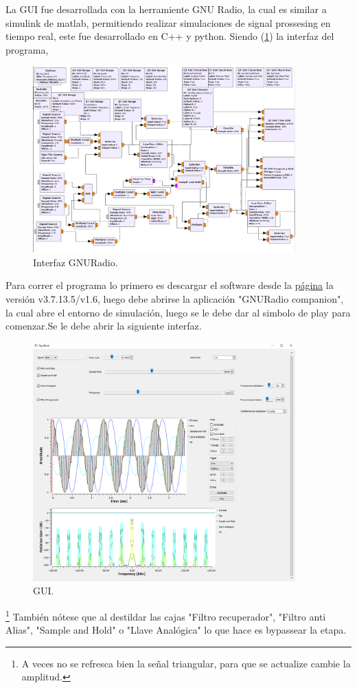 %

%

La GUI fue desarrollada con la herramiente GNU Radio, la cual es similar a simulink de matlab, permitiendo realizar simulaciones de signal prossesing en tiempo real, este fue desarrollado en C++ y python.
Siendo (\ref{fig:gnu}) la interfaz del programa,
 \begin{figure}[H]
	\centering
	\includegraphics[width=0.9\textwidth]{ImagenesEjercicio5/gnuradio.PNG}
\caption{Interfaz GNURadio.}
	\label{fig:gnu}
\end{figure}
Para correr el programa lo primero es descargar el software desde la \href{http://www.gcndevelopment.com/gnuradio/downloads.htm}{página} la versión v3.7.13.5/v1.6, luego debe abrirse la aplicación "GNURadio companion", la cual abre el entorno de simulación, luego se le debe dar al simbolo de play para comenzar.Se le debe abrir la siguiente interfaz.
 \begin{figure}[H]
	\centering
	\includegraphics[width=0.9\textwidth]{ImagenesEjercicio5/gui.PNG}
\caption{GUI.}
	\label{fig:GUI}
\end{figure}
\footnote{A veces no se refresca bien la señal triangular, para que se actualize cambie la amplitud.}
También nótese que al destildar las cajas "Filtro recuperador", "Filtro anti Alias", "Sample and Hold" o "Llave Analógica" lo que hace es bypassear la etapa.
%